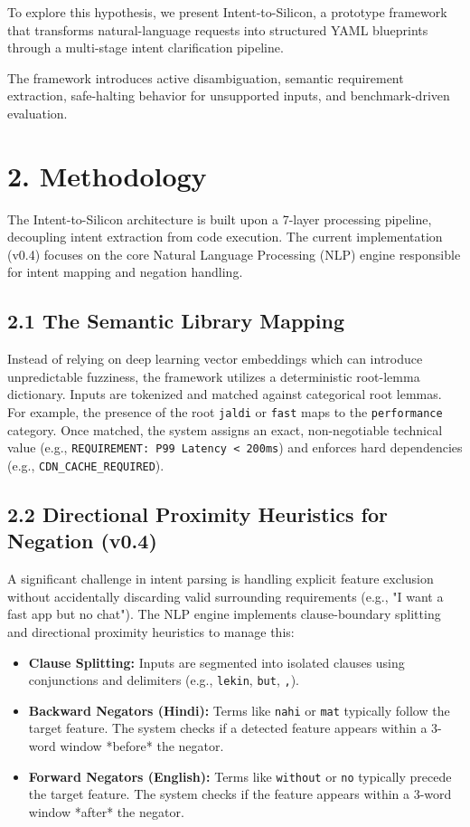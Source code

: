 \documentclass[11pt,a4paper]{article}
\begin{document}
To explore this hypothesis, we present Intent-to-Silicon, a prototype framework that transforms natural-language requests into structured YAML blueprints through a multi-stage intent clarification pipeline.

The framework introduces active disambiguation, semantic requirement extraction, safe-halting behavior for unsupported inputs, and benchmark-driven evaluation.



\section{2. Methodology}

The Intent-to-Silicon architecture is built upon a 7-layer processing pipeline, decoupling intent extraction from code execution. The current implementation (v0.4) focuses on the core Natural Language Processing (NLP) engine responsible for intent mapping and negation handling.

\subsection{2.1 The Semantic Library Mapping}
Instead of relying on deep learning vector embeddings which can introduce unpredictable fuzziness, the framework utilizes a deterministic root-lemma dictionary. Inputs are tokenized and matched against categorical root lemmas. For example, the presence of the root \texttt{jaldi} or \texttt{fast} maps to the \texttt{performance} category. Once matched, the system assigns an exact, non-negotiable technical value (e.g., \texttt{REQUIREMENT: P99 Latency < 200ms}) and enforces hard dependencies (e.g., \texttt{CDN_CACHE_REQUIRED}). 

\subsection{2.2 Directional Proximity Heuristics for Negation (v0.4)}
A significant challenge in intent parsing is handling explicit feature exclusion without accidentally discarding valid surrounding requirements (e.g., "I want a fast app but no chat"). The NLP engine implements clause-boundary splitting and directional proximity heuristics to manage this:
\begin{itemize}
    \item \textbf{Clause Splitting:} Inputs are segmented into isolated clauses using conjunctions and delimiters (e.g., \texttt{lekin}, \texttt{but}, \texttt{,}).
    \item \textbf{Backward Negators (Hindi):} Terms like \texttt{nahi} or \texttt{mat} typically follow the target feature. The system checks if a detected feature appears within a 3-word window *before* the negator.
    \item \textbf{Forward Negators (English):} Terms like \texttt{without} or \texttt{no} typically precede the target feature. The system checks if the feature appears within a 3-word window *after* the negator.
\end{itemize}
\end{document}

